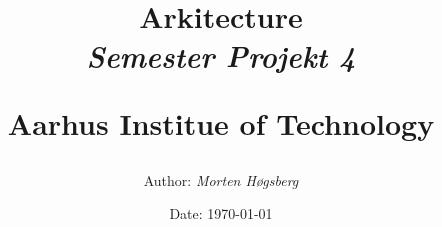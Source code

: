 \newcommand{\authorName}{Morten Høgsberg}
\newcommand{\titleName}{Arkitecture}
\newcommand{\subject}{Semester Projekt 4}
\newcommand{\institute}{Aarhus Institue of Technology}
\begin{titlepage}
  \centering
    \title
    {
      \Huge \textbf{\titleName}\\
      \scale{\numberSQRTTWO}{\vspace{\sol pt}}
      \LARGE \textit{\subject}
      \scale{\numberSQRTTWO}{\rule{\linewidth}{\sol pt}}

      \textbf{\institute}
      \author
    {
      \LARGE Author: \textit{\authorName}
    }
      \date{\LARGE Date: \today}
    }
\end{titlepage}
